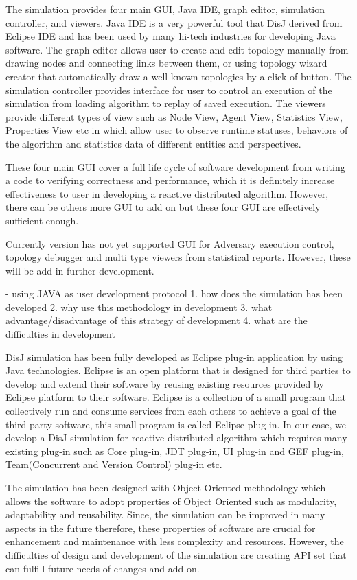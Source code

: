 The simulation provides four main GUI, Java IDE, graph editor, simulation controller, and viewers. Java IDE is a very powerful tool that DisJ derived from Eclipse IDE and has been used by many hi-tech industries for developing Java software. The graph editor allows user to create and edit topology manually from drawing nodes and connecting links between them, or using topology wizard creator that automatically draw a well-known topologies by a click of button. The simulation controller provides interface for user to control an execution of the simulation from loading algorithm to replay of saved execution. The viewers provide different types of view such as Node View, Agent View, Statistics View, Properties View etc in which allow user to observe runtime statuses, behaviors of the algorithm and statistics data of different entities and perspectives.

These four main GUI cover a full life cycle of software development from writing a code to verifying correctness and performance, which it is definitely increase effectiveness to user in developing a reactive distributed algorithm. However, there can be others more GUI to add on but these four GUI are effectively sufficient enough.

Currently version has not yet supported GUI for Adversary execution control, topology debugger and multi type viewers from statistical reports. However, these will be add in further development.

- using JAVA as user development protocol
1. how does the simulation has been developed
2. why use this methodology in development
3. what advantage/disadvantage of this strategy of development
4. what are the difficulties in development

DisJ simulation has been fully developed as Eclipse plug-in application by using Java technologies. Eclipse is an open platform that is designed for third parties to develop and extend their software by reusing existing resources provided by Eclipse platform to their software. Eclipse is a collection of a small program that collectively run and consume services from each others to achieve a goal of the third party software, this small program is called Eclipse plug-in. In our case, we develop a DisJ simulation for reactive distributed algorithm which requires many existing plug-in such as Core plug-in, JDT plug-in, UI plug-in and GEF plug-in, Team(Concurrent and Version Control) plug-in etc.

The simulation has been designed with Object Oriented methodology which allows the software to adopt properties of Object Oriented such as modularity, adaptability and reusability. Since, the simulation can be improved in many aspects in the future therefore, these properties of software are crucial for enhancement and maintenance with less complexity and resources. However, the difficulties of design and development of the simulation are creating API set that can fulfill future needs of changes and add on.

